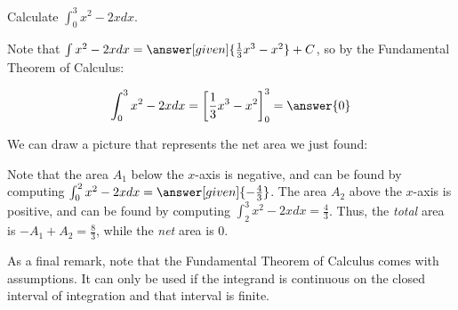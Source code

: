 \documentclass[nooutcomes]{ximera}
\begin{document}
\begin{example}
Calculate $\int_0^{3} x^2-2x  dx.$  

\begin{explanation}
Note that $\int x^2-2x dx = \answer[given]{\frac{1}{3}x^3-x^2}+C$, so by the Fundamental Theorem of Calculus:

\[
\int_0^3 x^2-2x dx = \bigg[\frac{1}{3}x^3-x^2 \bigg]_0^3 = \answer{0}
\]
\end{explanation}

We can draw a picture that represents the net area we just found:

\begin{image}
\end{image}

Note that the area $A_1$ below the $x$-axis is negative, and can be found by computing $\int_0^2 x^2-2x dx = \answer[given]{-\frac{4}{3}}$.  The area $A_2$ above the $x$-axis is positive, and can be found by computing $\int_2^3 x^2-2x dx = \frac{4}{3}$.  Thus, the \emph{total} area is $-A_1+A_2 = \frac{8}{3}$, while the \emph{net} area is $0$.  
\end{example}

As a final remark, note that the Fundamental Theorem of Calculus comes with assumptions.  It can only be used if the integrand is continuous on the closed interval of integration and that interval is finite.
\end{document}
